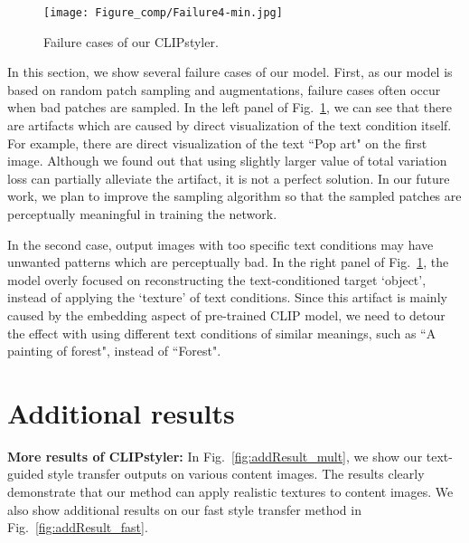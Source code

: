 \documentclass[10pt,twocolumn,letterpaper]{article}
\begin{document}
\begin{figure}[!t]

\centering
\texttt{[image: Figure\_comp/Failure4-min.jpg]}
\vspace*{-0.5cm}
\caption{Failure cases of our CLIPstyler.
}
\label{fig:failure}
\end{figure}

In this section, we show several failure cases of our model. First, as our model is based on random patch sampling and augmentations, failure cases often occur when bad patches are sampled. In the left panel of  Fig.~\ref{fig:failure},  we can see that there are artifacts which are caused by direct visualization of the text condition itself. For example, there are direct visualization of the text ``Pop art" on the first image. Although we found out that using slightly larger value of total variation loss can partially alleviate the artifact, it is not a perfect solution. In our future work, we plan to improve the sampling algorithm so that the sampled patches are perceptually meaningful in training the network. 

In the second case, output images with too specific text conditions may have unwanted patterns which are perceptually bad. In the right panel of Fig.~\ref{fig:failure}, the model overly focused on reconstructing the text-conditioned target `object', instead of applying the `texture' of text conditions. Since this artifact is mainly caused by the embedding aspect of pre-trained CLIP model, we need to detour the effect with using different text conditions of similar meanings, such as ``A painting of forest", instead of ``Forest".




\section{Additional results}
\noindent\textbf{More results of CLIPstyler:} In Fig.~\ref{fig:addResult_mult}, we show our text-guided style transfer outputs on various content images.
The results clearly demonstrate that our method can apply realistic textures to content images. We also show additional results on our fast style transfer method in Fig.~\ref{fig:addResult_fast}.
\end{document}
